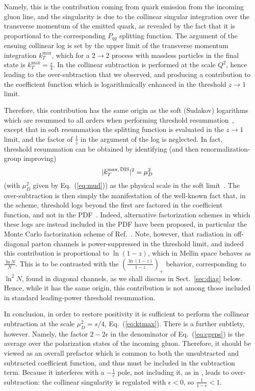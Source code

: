 Namely, this is the
contribution coming from quark emission from the incoming gluon line,
and the singularity is due to the collinear singular integration over
the transverse momentum of the emitted quark, as revealed by the fact
that it is proportional to the corresponding $P_{qg}$ splitting
function. The argument of the ensuing collinear log is set by the
upper limit of the transverse momentum integration $k_T^{\textrm{max}}$,
which for a $2\to2$ process with massless particles in the final state
is $k_T^{\textrm{max}}=\frac{s}{4}$. In \msbar{}
the collinear subtraction is performed at the scale $Q^2$,
hence leading to the over-subtraction that we observed, and producing
a contribution to the coefficient function which is logarithmically
enhanced in the threshold $z\to1$ limit.

Therefore, this contribution has the same origin as the soft (Sudakov)
logarithms 
which are resummed to all orders
when performing threshold
resummation~\cite{Catani:1989ne,Sterman:1986aj}, except that 
in soft resummation the splitting function is evaluated in the $z\to1$
limit, and the factor of $\frac{1}{z}$ in the argument of the log is
neglected.
In fact, threshold resummation can be
obtained by identifying (and then
renormalization-group improving)
\begin{equation}\label{eq:ktmax}
 |k_T^{\textrm{max,\,DIS}}|^2=\mu_D^2
\end{equation}
(with $\mu_D^2$ given by Eq.~(\ref{eq:mud}))
  as the physical
scale in the soft limit~\cite{Forte:2002ni}. The over-subtraction is then
simply the manifestation of the well-known fact that, in the \msbar{} scheme,
threshold logs beyond the first are factored in the coefficient
function, and not in the PDF~\cite{Albino:2000cp}. Indeed, alternative
factorization schemes in which these logs are instead included in the
PDF have been proposed, in particular  the Monte Carlo
factorization scheme of Ref.~\cite{Jadach:2016acv}. Note, however, that
radiation in off-diagonal parton channels is power-suppressed in the
threshold limit, and indeed this contribution is proportional to
$\ln(1-z)$, which in Mellin space behaves as $\frac{\ln N}{N}$. This is to be
contrasted with the $\left(\frac{\ln(1-z)}{1-z}\right)_+$ behavior, corresponding to 
$\ln^2 N$, found in diagonal channels, as we shall discuss in
Sect.~\ref{sec:diag} below. Hence, while it has the same origin, this
contribution is not among those included in standard leading-power
threshold resummation. 

In conclusion,  in order to
restore positivity it is  sufficient to perform the collinear
subtraction at the scale $\mu_D^2=s/4$, Eq.~(\ref{eq:ktmax}).
There is a further subtlety, however. Namely, the factor $2-2\epsilon$
in the denominator of Eq.~(\ref{eq:cgeps}) is the average over the
polarization states of the incoming gluon. Therefore, it should be
viewed as an overall prefactor which is common to both the
unsubtracted and subtracted coefficient function, and thus  must be
included in the subtraction term. Because it interferes with a
$-\frac{1}{\epsilon}$ pole, not including it, as in \msbar{}, leads to
over-subtraction: 
the collinear singularity is regulated with
$\epsilon<0$, so $\frac{1}{1-\epsilon}<1$.  

